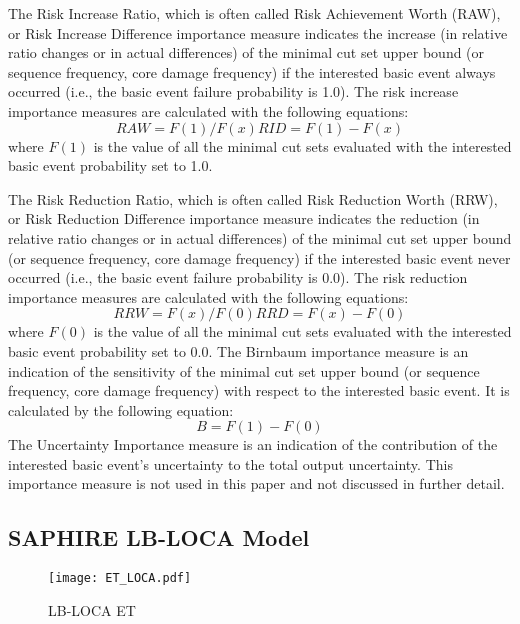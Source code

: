 The Risk Increase Ratio, which is often called Risk Achievement Worth (RAW), or Risk 
Increase Difference importance measure indicates the increase (in relative ratio 
changes or in actual differences) of the minimal cut set upper bound (or sequence 
frequency, core damage frequency) if the interested basic event always occurred 
(i.e., the basic event failure probability is 1.0). 
The risk increase importance measures are calculated with the following equations:
\begin{equation}
RAW=F(1)/F(x)
RID=F(1)-F(x)
\end{equation}
where $F(1)$ is the value of all the minimal cut sets evaluated with the interested basic event probability set to 1.0.

The Risk Reduction Ratio, which is often called Risk Reduction Worth (RRW), 
or Risk Reduction Difference importance measure indicates the reduction (in relative 
ratio changes or in actual differences) of the minimal cut set upper bound (or sequence 
frequency, core damage frequency) if the interested basic event never occurred 
(i.e., the basic event failure probability is 0.0). 
The risk reduction importance measures are calculated with the following equations:
\begin{equation}
RRW=F(x)/F(0)
RRD=F(x)-F(0)
\end{equation}
where $F(0)$ is the value of all the minimal cut sets evaluated with the interested basic 
event probability set to 0.0.
The Birnbaum importance measure is an indication of the sensitivity of the minimal 
cut set upper bound (or sequence frequency, core damage frequency) with respect to 
the interested basic event. It is calculated by the following equation:
\begin{equation}
B=F(1)-F(0)
\end{equation}
The Uncertainty Importance measure is an indication of the contribution of the 
interested basic event’s uncertainty to the total output uncertainty. 
This importance measure is not used in this paper and not discussed in further detail.

\subsection{SAPHIRE LB-LOCA Model}

\begin{figure}
    \centering
    \texttt{[image: ET\_LOCA.pdf]}
    \caption{LB-LOCA ET}
    \label{fig:ET_LOCA}
\end{figure} 

